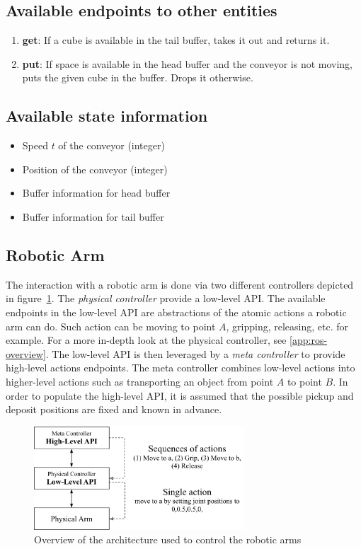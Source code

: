 \subsection*{Available endpoints to other entities}
\begin{enumerate}[label=(\arabic*)]
\item \textbf{get}: If a cube is available in the tail buffer, takes it out and returns it.
\item \textbf{put}: If space is available in the head buffer and the conveyor is not moving, puts the given cube in the buffer. Drops it otherwise.
\end{enumerate} 

\subsection*{Available state information}
\begin{itemize}[noitemsep]
\item Speed $t$ of the conveyor (integer)
\item Position of the conveyor (integer)
\item Buffer information for head buffer
\item Buffer information for tail buffer
\end{itemize}


\subsection{Robotic Arm}

The interaction with a robotic arm is done via two different controllers depicted in figure~\ref{fig:architecture-arm-controller}. The \textit{physical controller} provide a low-level API. The available endpoints in the low-level API are abstractions of the atomic actions a robotic arm can do. Such action can be moving to point $A$, gripping, releasing, etc. for example. For a more in-depth look at the physical controller, see \ref{app:ros-overview}. The low-level API is then leveraged by a \textit{meta controller} to provide high-level actions endpoints. The meta controller combines low-level actions into higher-level actions such as transporting an object from point $A$ to point $B$. In order to populate the high-level API, it is assumed that the possible pickup and deposit positions are fixed and known in advance.

\begin{figure}[H]
\centering
\includegraphics[width=0.7\textwidth]{imgs/ros-gazebo-archi-1.png}
\caption[Overview of the architecture used to control the robotic arms]{Overview of the architecture used to control the robotic arms}
\label{fig:architecture-arm-controller}
\end{figure}


